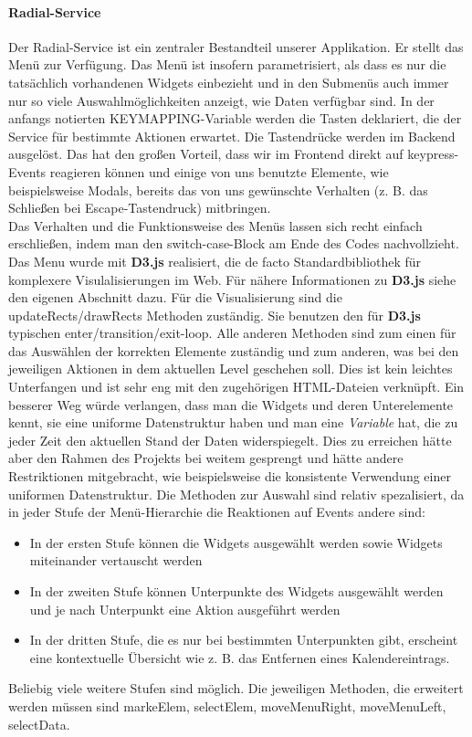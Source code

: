 \documentclass[10pt,a4paper]{report}
\newcommand{\code}[1]{{\fontfamily{cmvtt}\selectfont #1}}
\begin{document}
				\paragraph{Radial-Service}
					Der Radial-Service ist ein zentraler Bestandteil unserer Applikation. Er stellt das Menü zur Verfügung. Das Menü ist insofern parametrisiert, als dass es nur die tatsächlich vorhandenen Widgets einbezieht und in den Submenüs auch immer nur so viele Auswahlmöglichkeiten anzeigt, wie Daten verfügbar sind. In der anfangs notierten \code{KEYMAPPING}-Variable werden die Tasten deklariert, die der Service für bestimmte Aktionen erwartet. Die Tastendrücke werden im Backend ausgelöst. Das hat den großen Vorteil, dass wir im Frontend direkt auf keypress-Events reagieren können und einige von uns benutzte Elemente, wie beispielsweise Modals, bereits das von uns gewünschte Verhalten (z. B. das Schließen bei Escape-Tastendruck) mitbringen.\\
					Das Verhalten und die Funktionsweise des Menüs lassen sich recht einfach erschließen, indem man den switch-case-Block am Ende des Codes nachvollzieht.
					Das Menu wurde mit \textbf{D3.js} realisiert, die de facto Standardbibliothek für komplexere Visulalisierungen im Web.
					Für nähere Informationen zu \textbf{D3.js} siehe den eigenen Abschnitt dazu.
					Für die Visualisierung sind die \code{updateRects/drawRects} Methoden zuständig. Sie benutzen den für \textbf{D3.js} typischen enter/transition/exit-loop.
					Alle anderen Methoden sind zum einen für das Auswählen der korrekten Elemente zuständig und zum anderen, was bei den jeweiligen Aktionen in dem aktuellen Level geschehen soll.
					Dies ist kein leichtes Unterfangen und ist sehr eng mit den zugehörigen HTML-Dateien verknüpft. Ein besserer Weg würde verlangen, dass man die Widgets und deren Unterelemente kennt, sie eine uniforme Datenstruktur haben und man eine \textit{Variable} hat, die zu jeder Zeit den aktuellen Stand der Daten widerspiegelt.
					Dies zu erreichen hätte aber den Rahmen des Projekts bei weitem gesprengt und hätte andere Restriktionen mitgebracht, wie beispielsweise die konsistente Verwendung einer uniformen Datenstruktur.
					Die Methoden zur Auswahl sind relativ spezalisiert, da in jeder Stufe der Menü-Hierarchie die Reaktionen auf Events andere sind:
					\begin{itemize}
						\item In der ersten Stufe können die Widgets ausgewählt werden sowie Widgets miteinander vertauscht werden
						\item In der zweiten Stufe können Unterpunkte des Widgets ausgewählt werden und je nach Unterpunkt eine Aktion ausgeführt werden
						\item In der dritten Stufe, die es nur bei bestimmten Unterpunkten gibt, erscheint eine kontextuelle Übersicht wie z. B. das Entfernen eines Kalendereintrags.
					\end{itemize}
					Beliebig viele weitere Stufen sind möglich. Die jeweiligen Methoden, die erweitert werden müssen sind \code{markeElem, selectElem, moveMenuRight, moveMenuLeft, selectData}.
\end{document}
